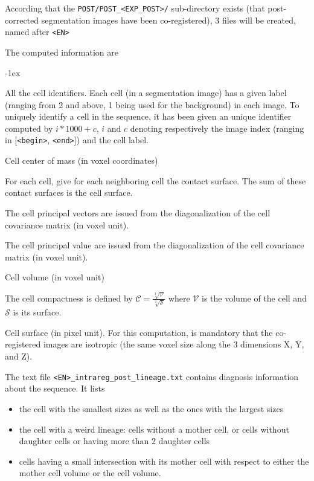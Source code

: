 According that the \texttt{POST/POST\_<EXP\_POST>/} sub-directory exists (that post-corrected segmentation images have been co-registered), 3 files will be created, named after \texttt{<EN>}

\mbox{}

The computed information are
\begin{description}
  \itemsep -1ex
\item[\texttt{all\_cells}] All the cell identifiers. Each cell (in a segmentation image) has a given label (ranging from 2 and above, 1 being used for the background) in each image. To uniquely identify a cell in the sequence, it has been given an unique identifier computed by $i * 1000 + c$, $i$ and $c$ denoting respectively the image index (ranging in [\texttt{<begin>}, \texttt{<end>}]) and the cell label.
\item[\texttt{cell\_barycenter}] Cell center of mass (in voxel coordinates)
\item[\texttt{cell\_contact\_surface}] For each cell, give for each neighboring cell the contact surface. The sum of these contact surfaces is the cell surface.
\item[\texttt{cell\_principal\_vectors}] The cell principal vectors are issued from the diagonalization of the cell covariance matrix (in voxel unit).
\item[\texttt{cell\_principal\_values}] The cell principal value are issued from the diagonalization of the cell covariance matrix (in voxel unit).
\item[\texttt{cell\_volume}] Cell volume (in voxel unit)
\item[\texttt{cell\_compactness}] The cell compactness is defined by $\mathcal{C} =\frac{\sqrt[3]{\mathcal{V}}}{\sqrt[2]{\mathcal{S}}}$ where $\mathcal{V}$ is the volume of the cell and $\mathcal{S}$ is its surface.
\item[\texttt{cell\_surface}] Cell surface (in pixel unit). For this computation, is mandatory that the co-registered images are isotropic (the same voxel size along the 3 dimensions X, Y, and Z).
\item[\texttt{cell\_lineage}]
\end{description}

The text file \texttt{<EN>\_intrareg\_post\_lineage.txt} contains diagnosis information about the sequence. It lists
\begin{itemize}
  \itemsep -1ex
\item the cell with the smallest sizes as well as the ones with the largest sizes
\item the cell with a weird lineage: cells without a mother cell, or cells without daughter cells or having more than 2 daughter cells
\item cells having a small intersection with its mother cell with respect to either the mother cell volume or the cell volume. 
\end{itemize}

